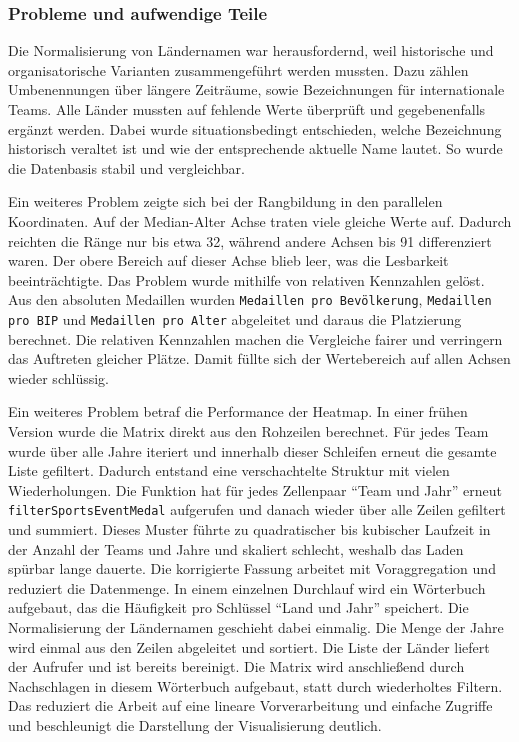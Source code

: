 \subsubsection{Probleme und aufwendige Teile}
Die Normalisierung von Ländernamen war herausfordernd, weil historische und organisatorische Varianten zusammengeführt werden mussten. Dazu zählen Umbenennungen über längere Zeiträume, sowie Bezeichnungen für internationale Teams. Alle Länder mussten auf fehlende Werte überprüft und gegebenenfalls ergänzt werden. Dabei wurde situationsbedingt entschieden, welche Bezeichnung historisch veraltet ist und wie der entsprechende aktuelle Name lautet. So wurde die Datenbasis stabil und vergleichbar.

Ein weiteres Problem zeigte sich bei der Rangbildung in den parallelen Koordinaten. Auf der Median-Alter Achse traten viele gleiche Werte auf. Dadurch reichten die Ränge nur bis etwa 32, während andere Achsen bis 91 differenziert waren. Der obere Bereich auf dieser Achse blieb leer, was die Lesbarkeit beeinträchtigte. Das Problem wurde mithilfe von relativen Kennzahlen gelöst. Aus den absoluten Medaillen wurden \texttt{Medaillen pro Bevölkerung}, \texttt{Medaillen pro BIP} und \texttt{Medaillen pro Alter} abgeleitet und daraus die Platzierung berechnet. Die relativen Kennzahlen machen die Vergleiche fairer und verringern das Auftreten gleicher Plätze. Damit füllte sich der Wertebereich auf allen Achsen wieder schlüssig.

Ein weiteres Problem betraf die Performance der Heatmap. In einer frühen Version wurde die Matrix direkt aus den Rohzeilen berechnet. Für jedes Team wurde über alle Jahre iteriert und innerhalb dieser Schleifen erneut die gesamte Liste gefiltert. Dadurch entstand eine verschachtelte Struktur mit vielen Wiederholungen. Die Funktion hat für jedes Zellenpaar \enquote{Team und Jahr} erneut \texttt{filterSportsEventMedal} aufgerufen und danach wieder über alle Zeilen gefiltert und summiert. Dieses Muster führte zu quadratischer bis kubischer Laufzeit in der Anzahl der Teams und Jahre und skaliert schlecht, weshalb das Laden spürbar lange dauerte. Die korrigierte Fassung arbeitet mit Voraggregation und reduziert die Datenmenge. In einem einzelnen Durchlauf wird ein Wörterbuch aufgebaut, das die Häufigkeit pro Schlüssel \enquote{Land und Jahr} speichert. Die Normalisierung der Ländernamen geschieht dabei einmalig. Die Menge der Jahre wird einmal aus den Zeilen abgeleitet und sortiert. Die Liste der Länder liefert der Aufrufer und ist bereits bereinigt. Die Matrix wird anschließend durch Nachschlagen in diesem Wörterbuch aufgebaut, statt durch wiederholtes Filtern. Das reduziert die Arbeit auf eine lineare Vorverarbeitung und einfache Zugriffe und beschleunigt die Darstellung der Visualisierung deutlich.


